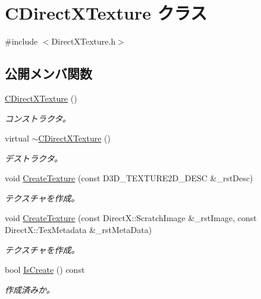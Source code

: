 \hypertarget{class_c_direct_x_texture}{}\section{C\+Direct\+X\+Texture クラス}
\label{class_c_direct_x_texture}


{\ttfamily \#include $<$Direct\+X\+Texture.\+h$>$}

\subsection*{公開メンバ関数}
\begin{DoxyCompactItemize}
\item 
\hyperlink{class_c_direct_x_texture_a23305fa228b1ed1d3071b1cccae38d3c}{C\+Direct\+X\+Texture} ()
\begin{DoxyCompactList}\small\item\em コンストラクタ。 \end{DoxyCompactList}\item 
virtual \hyperlink{class_c_direct_x_texture_afd62064ff20750c1cc1dfd900ffac90c}{$\sim$\+C\+Direct\+X\+Texture} ()
\begin{DoxyCompactList}\small\item\em デストラクタ。 \end{DoxyCompactList}\item 
void \hyperlink{class_c_direct_x_texture_a544fd8fb0c2f2b26853f4930764da184}{Create\+Texture} (const D3\+D\+\_\+\+T\+E\+X\+T\+U\+R\+E2\+D\+\_\+\+D\+E\+S\+C \&\+\_\+rst\+Desc)
\begin{DoxyCompactList}\small\item\em テクスチャを作成。 \end{DoxyCompactList}\item 
void \hyperlink{class_c_direct_x_texture_affed68cea7e19ca01c60056abfc0a6ef}{Create\+Texture} (const Direct\+X\+::\+Scratch\+Image \&\+\_\+rst\+Image, const Direct\+X\+::\+Tex\+Metadata \&\+\_\+rst\+Meta\+Data)
\begin{DoxyCompactList}\small\item\em テクスチャを作成。 \end{DoxyCompactList}\item 
bool \hyperlink{class_c_direct_x_texture_ab38734e60f44980fe0b63eef1c9f5eff}{Is\+Create} () const 
\begin{DoxyCompactList}\small\item\em 作成済みか。 \end{DoxyCompactList}\end{DoxyCompactItemize}
